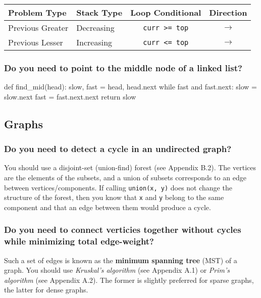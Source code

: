\documentclass[12pt, titlepage]{article}
\begin{document}
\begin{center}
\begin{tabular}{|l|l|c|c|}
  \hline
  Problem Type & Stack Type & Loop Conditional & Direction \\
  \hline
  Previous Greater & Decreasing & \texttt{curr >= top} & $\rightarrow$ \\
  Previous Lesser & Increasing & \texttt{curr <= top} & $\rightarrow$ \\
  \hline
\end{tabular}
\end{center} \bigskip

\subsubsection{Do you need to point to the middle node of a linked list?}

\begin{python}
def find_mid(head):
    slow, fast = head, head.next
    while fast and fast.next:
        slow = slow.next
        fast = fast.next.next
    return slow
\end{python}

\subsection{Graphs}
\subsubsection{Do you need to detect a cycle in an undirected graph?}

You should use a disjoint-set (union-find) forest (see Appendix B.2). The vertices are the elements of the subsets, and a union of subsets corresponds to an edge between vertices/components. If calling \texttt{union(x, y)} does not change the structure of the forest, then you know that \texttt{x} and \texttt{y} belong to the same component and that an edge between them would produce a cycle.

\subsubsection{Do you need to connect verticies together without cycles while minimizing total edge-weight?}

Such a set of edges is known as the \textbf{minimum spanning tree} (MST) of a graph. You should use \textit{Kruskal's algorithm} (see Appendix A.1) or \textit{Prim's algorithm} (see Appendix A.2). The former is slightly preferred for sparse graphs, the latter for dense graphs.
\end{document}
